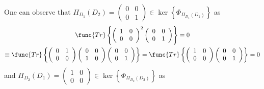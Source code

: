\documentclass[aps,preprint]{revtex4}
\begin{document}
One can observe that $\mathcal{\Pi }_{D_{1}}\left( D_{2}\right) =\left( 
\begin{array}{cc}
0 & 0 \\ 
0 & 1%
\end{array}%
\right) \in \ker \left\{ \Phi _{\mathcal{\Pi }_{D_{1}}\left( D_{1}\right)
}\right\} $ as 
\begin{gather}
\func{Tr}\left\{ \left( 
\begin{array}{cc}
1 & 0 \\ 
0 & 0%
\end{array}%
\right) ^{2}\left( 
\begin{array}{cc}
0 & 0 \\ 
0 & 1%
\end{array}%
\right) \right\} =0 \\
\equiv \func{Tr}\left\{ \left( 
\begin{array}{cc}
0 & 1 \\ 
0 & 0%
\end{array}%
\right) \left( 
\begin{array}{cc}
0 & 0 \\ 
1 & 0%
\end{array}%
\right) \left( 
\begin{array}{cc}
0 & 0 \\ 
0 & 1%
\end{array}%
\right) \right\} =\func{Tr}\left\{ \left( 
\begin{array}{cc}
1 & 0 \\ 
0 & 0%
\end{array}%
\right) \left( 
\begin{array}{cc}
0 & 0 \\ 
0 & 1%
\end{array}%
\right) \right\} =0
\end{gather}%
and $\mathcal{\Pi }_{D_{2}}\left( D_{1}\right) =\left( 
\begin{array}{cc}
1 & 0 \\ 
0 & 0%
\end{array}%
\right) \in \ker \left\{ \Phi _{\mathcal{\Pi }_{D_{2}}\left( D_{2}\right)
}\right\} $ as 
\end{document}
